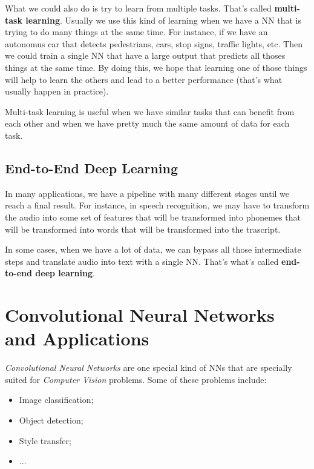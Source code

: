 \documentclass[12pt, a4paper, oneside]{book}
\begin{document}
What we could also do is try to learn from multiple tasks. That's called
\textbf{multi-task learning}. Usually we use this kind of learning when we have
a NN that is trying to do many things at the same time. For instance, if we have
an autonomus car that detects pedestrians, cars, stop signs, traffic lights,
etc. Then we could train a single NN that have a large output that predicts all
thoses things at the same time. By doing this, we hope that learning one of
those things will help to learn the others and lead to a better performance
(that's what usually happen in practice).

Multi-task learning is useful when we have similar tasks that can benefit from
each other and when we have pretty much the same amount of data for each task.

\section{End-to-End Deep Learning}%
\label{sec:end_to_end_deep_learning}

In many applications, we have a pipeline with many different stages until we
reach a final result. For instance, in speech recognition, we may have to
transform the audio into some set of features that will be transformed into
phonemes that will be transformed into words that will be transformed into the
trascript.

In some cases, when we have a lot of data, we can bypass all those intermediate
steps and translate audio into text with a single NN. That's what's called
\textbf{end-to-end deep learning}.


\chapter{Convolutional Neural Networks and Applications}%
\label{cha:convolutional_neural_networks_and_applications}

\textit{Convolutional Neural Networks} are one special kind of NNs that are
specially suited for \textit{Computer Vision} problems. Some of these problems
include:
\begin{itemize}
    \item Image classification;
    \item Object detection;
    \item Style transfer;
    \item ...
\end{itemize}
\end{document}
